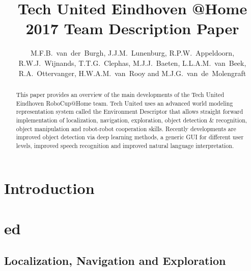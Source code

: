 \documentclass[runningheads,a4paper]{llncs}
\begin{document}
\title{Tech United Eindhoven @Home \\2017 Team Description Paper}
\author{M.F.B.~van~der~Burgh, J.J.M.~Lunenburg, R.P.W.~Appeldoorn, R.W.J.~Wijnands, T.T.G.~Clephas, M.J.J.~Baeten, L.L.A.M.~van~Beek, R.A.~Ottervanger, H.W.A.M.~van~Rooy and M.J.G.~van~de~Molengraft}

\maketitle



\begin{abstract}
This paper provides an overview of the main developments of the Tech United Eindhoven RoboCup@Home team. Tech United uses an advanced world modeling representation system called the Environment Descriptor that allows straight forward implementation of localization, navigation, exploration, object detection \& recognition, object manipulation and robot-robot cooperation skills. Recently developments are improved object detection via deep learning methods, a generic GUI for different user levels, improved speech recognition and improved natural language interpretation.
\end{abstract}


\section{Introduction}


\section{\acrfull{ed}}


\subsection{Localization, Navigation and Exploration}

\end{document}
